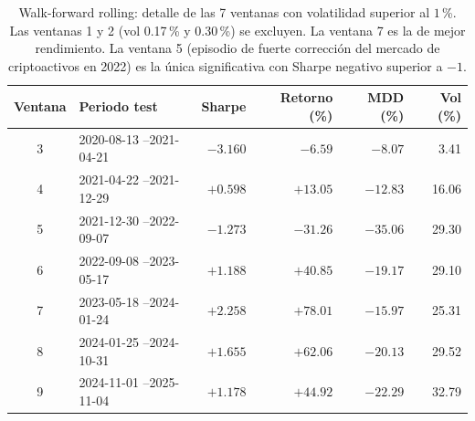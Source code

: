 \documentclass[IB,a4paper]{TFUOC}
\begin{document}
\begin{table}[h]
\centering
\renewcommand{\arraystretch}{1.25}
\caption[Resumen de la validación temporal: \textit{walk-forward} y \textit{expanding window}.]{Resumen de la validación temporal con ambas versiones de Sharpe: \textit{Sharpe robusto} se calcula solo sobre ventanas con volatilidad anualizada $>1$\,\%; \textit{Sharpe sin filtro} agrega todas las ventanas (incluyendo las próximas a la liquidez con Sharpe distorsionado, véase sección \ref{sec:validacion}). Las medianas asociadas son $1.178$ (WF filtrado) frente a $0.598$ (WF sin filtro) y $1.066$ (EW filtrado) frente a $-1.166$ (EW sin filtro), lo que ilustra cuánto pesa el ruido de las ventanas de baja volatilidad sobre el agregado.}
\label{tab:resultados_validacion}
\end{table}

\begin{table}[h]
\centering
\small
\setlength{\tabcolsep}{4pt}
\renewcommand{\arraystretch}{1.25}
\begin{tabular}{|c|l|r|r|r|r|}
\hline
\textbf{Ventana} & \textbf{Periodo test} & \textbf{Sharpe} & \textbf{Retorno (\%)} & \textbf{MDD (\%)} & \textbf{Vol (\%)} \\ \hline
3 & 2020-08-13 --2021-04-21 & $-3.160$ & $-6.59$  & $-8.07$  & 3.41  \\ \hline
4 & 2021-04-22 --2021-12-29 & $+0.598$ & $+13.05$ & $-12.83$ & 16.06 \\ \hline
5 & 2021-12-30 --2022-09-07 & $-1.273$ & $-31.26$ & $-35.06$ & 29.30 \\ \hline
6 & 2022-09-08 --2023-05-17 & $+1.188$ & $+40.85$ & $-19.17$ & 29.10 \\ \hline
7 & 2023-05-18 --2024-01-24 & $\mathbf{+2.258}$ & $+78.01$ & $-15.97$ & 25.31 \\ \hline
8 & 2024-01-25 --2024-10-31 & $+1.655$ & $+62.06$ & $-20.13$ & 29.52 \\ \hline
9 & 2024-11-01 --2025-11-04 & $+1.178$ & $+44.92$ & $-22.29$ & 32.79 \\ \hline
\end{tabular}
\caption[Walk-forward rolling: detalle de las 7 ventanas significativas.]{Walk-forward rolling: detalle de las 7 ventanas con volatilidad superior al $1$\,\%. Las ventanas 1 y 2 (vol 0.17\,\% y 0.30\,\%) se excluyen. La ventana 7 es la de mejor rendimiento. La ventana 5 (episodio de fuerte corrección del mercado de criptoactivos en 2022) es la única significativa con Sharpe negativo superior a $-1$.}
\label{tab:wf_por_ventana}
\end{table}
\end{document}
